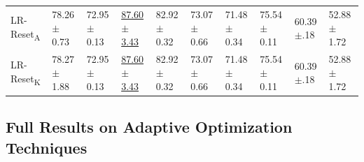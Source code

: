 \documentclass{article} %
\begin{document}
\begin{center}
\begin{sideways}
\begin{minipage}{0.9\textheight}
\begin{tabular}{llllllllll}
            LR-Reset\textsubscript{A} & 78.26$\pm$0.73             & 72.95$\pm$0.13           & \underline{87.60$\pm$3.43} & 82.92$\pm$0.32             & 73.07$\pm$0.66             & 71.48$\pm$0.34             & 75.54$\pm$0.11             & 60.39$\pm$.18            & 52.88$\pm$1.72          \\
            LR-Reset\textsubscript{K} & 78.27$\pm$1.88             & 72.95$\pm$0.13           & \underline{87.60$\pm$3.43} & 82.92$\pm$0.32             & 73.07$\pm$0.66             & 71.48$\pm$0.34             & 75.54$\pm$0.11             & 60.39$\pm$.18            & 52.88$\pm$1.72          \\
            \bottomrule
         \end{tabular}

      \end{minipage}
   \end{sideways}
\end{center}

\newpage
\subsection{Full Results on Adaptive Optimization Techniques}\label{app:optimizer_results}
\vfill
\end{document}

